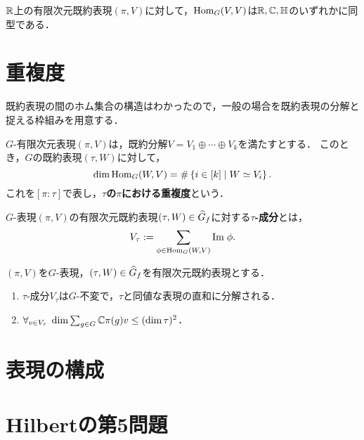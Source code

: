 \documentclass[uplatex,dvipdfmx]{jsreport}
\begin{document}
\begin{theorem}
    $\mathbb{R}$上の有限次元既約表現$(\pi,V)$に対して，$\mathrm{Hom}_G(V,V)$は$\mathbb{R},\mathbb{C},\mathbb{H}$のいずれかに同型である．
\end{theorem}

\section{重複度}

\begin{tcolorbox}[colframe=ForestGreen, colback=ForestGreen!10!white,breakable,colbacktitle=ForestGreen!40!white,coltitle=black,fonttitle=\bfseries\sffamily,
title=]
    既約表現の間のホム集合の構造はわかったので，一般の場合を既約表現の分解と捉える枠組みを用意する．
\end{tcolorbox}

\begin{theorem}[multiplicity]
    $G$-有限次元表現$(\pi,V)$は，既約分解$V=V_1\oplus\cdots\oplus V_k$を満たすとする．
    このとき，$G$の既約表現$(\tau,W)$に対して，
    \[\dim\mathrm{Hom}_G(W,V)=\#\left\{i\in[k]\mid W\simeq V_i\right\}.\]
    これを$[\pi:\tau]$で表し，\textbf{$\tau$の$\pi$における重複度}という．
\end{theorem}

\begin{definition}
    $G$-表現$(\pi,V)$の有限次元既約表現$(\tau,W)\in\widehat{G}_f$に対する\textbf{$\tau$-成分}とは，
    \[V_\tau:=\sum_{\phi\in\mathrm{Hom}_G(W,V)}\mathrm{Im}\;\phi.\]
\end{definition}

\begin{proposition}
    $(\pi,V)$を$G$-表現，$(\tau,W)\in\widehat{G}_f$を有限次元既約表現とする．
    \begin{enumerate}
        \item $\tau$-成分$V_\tau$は$G$-不変で，$\tau$と同値な表現の直和に分解される．
        \item $\forall_{v\in V_\tau}\;\dim\sum_{g\in G}\mathbb{C}\pi(g)v\le(\dim\tau)^2$．
    \end{enumerate}
\end{proposition}

\section{表現の構成}

\section{Hilbertの第5問題}
\end{document}
